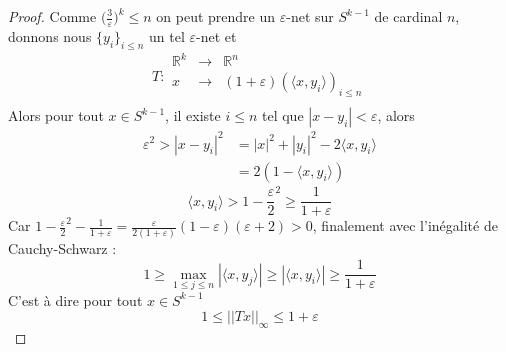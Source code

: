 \documentclass[12pt]{article}
\theoremstyle{definition}
\begin{document}
\begin{proof}
	Comme $\big(\frac{3}{\varepsilon}\big)^{k}\leq n$ on peut prendre un $\varepsilon$-net sur $S^{k-1}$ de cardinal $n$, donnons nous $\{y_i\}_{i\leq n}$ un tel $\varepsilon$-net et 
	\begin{equation*}
		T : \begin{array}{ccc}
				\mathbb{R}^k& \to &\mathbb{R}^n\\
				x & \to & (1+\varepsilon)(\langle x,y_i\rangle)_{i\leq n}\\
			\end{array}
	\end{equation*}
	Alors pour tout $x\in S^{k-1}$, il existe $i\leq n$ tel que $|x-y_i|<\varepsilon$, alors 
	\begin{align*}
		\varepsilon^2>|x-y_i|^2&=|x|^2+|y_i|^2-2\langle x,y_i\rangle \\
		&=2(1-\langle x,y_i\rangle)
	\end{align*}
	\begin{equation*}
		\langle x,y_i\rangle >1 - \frac{\varepsilon}{2}^2 \geq \frac{1}{1+\varepsilon}
	\end{equation*}
	Car $1 - \frac{\varepsilon}{2}^2-\frac{1}{1+\varepsilon}=\frac{\varepsilon}{2(1+\varepsilon)}(1-\varepsilon)(\varepsilon+2)>0$, finalement avec l'inégalité de Cauchy-Schwarz : 
	\begin{equation*}
		1\geq  \max_{1\leq j \leq n}|\langle x,y_j\rangle| \geq  |\langle x,y_i\rangle| \geq \frac{1}{1+\varepsilon}
	\end{equation*}
	C'est à dire pour tout $x\in S^{k-1}$
	\begin{equation*}
		1\leq ||Tx||_\infty \leq 1+\varepsilon
	\end{equation*} 
\end{proof}
\appendix
\end{document}
